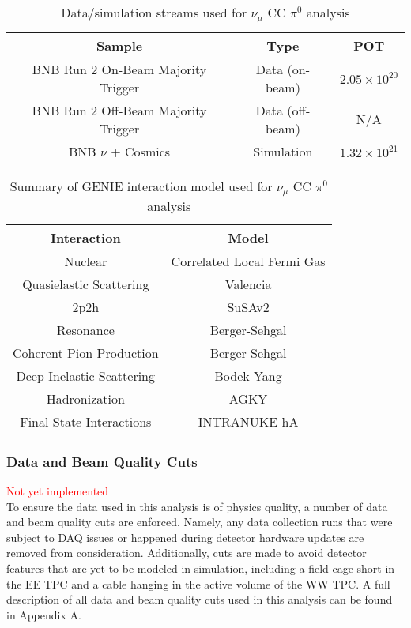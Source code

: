 \documentclass[../main.tex]{subfiles}
\begin{document}
\begin{table}[H]
    \caption{Data/simulation streams used for $\nu_{\mu}$ CC $\pi^{0}$ analysis}
    \vspace{0.1cm}
    \centering
    \begin{tabular}{ c c c } 
    \hline
    Sample  &  Type & POT  \\
    \hline
    BNB Run 2 On-Beam Majority Trigger & Data (on-beam) & $2.05 \times 10^{20}$ \\ 
    BNB Run 2 Off-Beam Majority Trigger & Data (off-beam) & N/A \\
    BNB $\nu$ + Cosmics & Simulation & $1.32 \times 10^{21}$ \\
    \hline
    \end{tabular}
    \label{Tab:prod}
\end{table}

\begin{table}[H]
    \caption{Summary of GENIE interaction model used for $\nu_{\mu}$ CC $\pi^{0}$ analysis}
    \vspace{0.1cm}
    \centering
    \begin{tabular}{ c c } 
    \hline
    Interaction  &  Model \\
    \hline
    Nuclear & Correlated Local Fermi Gas \\
    Quasielastic Scattering & Valencia \\
    2p2h & SuSAv2 \\
    Resonance & Berger-Sehgal \\
    Coherent Pion Production & Berger-Sehgal \\
    Deep Inelastic Scattering & Bodek-Yang \\
    Hadronization & AGKY \\
    Final State Interactions & INTRANUKE hA \\
    \hline
    \end{tabular}
    \label{Tab:genie}
\end{table}

\subsubsection{Data and Beam Quality Cuts}
\textcolor{red}{Not yet implemented}\\
To ensure the data used in this analysis is of physics quality, a number of data and beam quality cuts are enforced.  Namely, any data collection runs that were subject to DAQ issues or happened during detector hardware updates are removed from consideration.  Additionally, cuts are made to avoid detector features that are yet to be modeled in simulation, including a field cage short in the EE TPC and a cable hanging in the active volume of the WW TPC.  A full description of all data and beam quality cuts used in this analysis can be found in Appendix A.
\end{document}
